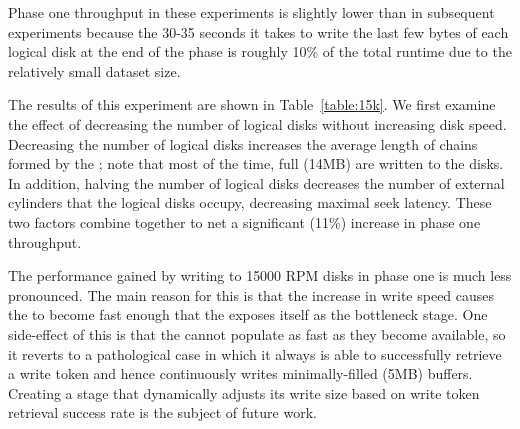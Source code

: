 Phase one throughput in these experiments is slightly lower than in subsequent
experiments because the 30-35 seconds it takes to write the last few bytes of
each logical disk at the end of the phase is roughly 10\% of the total runtime
due to the relatively small dataset size.

\begin{table}
\centering
\caption{\label{table:15k}Effect of increasing speed of intermediate disks
  on a two node, 500GB sort}
\end{table}

The results of this experiment are shown in Table~\ref{table:15k}.  We first
examine the effect of decreasing the number of logical disks without increasing
disk speed. Decreasing the number of logical disks increases the average length
of \ldbuffer chains formed by the \ldts; note that most of the time, full
\writerbuffers (14MB) are written to the disks. In addition, halving the number
of logical disks decreases the number of external cylinders that the logical
disks occupy, decreasing maximal seek latency. These two factors combine
together to net a significant (11\%) increase in phase one throughput.

The performance gained by writing to 15000 RPM disks in phase one is much less
pronounced. The main reason for this is that the increase in write speed causes
the \writers to become fast enough that the \ldts exposes itself as the
bottleneck stage. One side-effect of this is that the
\ldts cannot populate \writerbuffers as fast as they become available, so it
reverts to a pathological case in which it always is able to successfully
retrieve a write token and hence continuously writes minimally-filled (5MB)
buffers. Creating a \ldts stage that dynamically adjusts its write size based
on write token retrieval success rate is the subject of future work.


